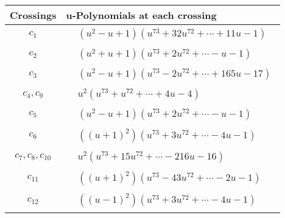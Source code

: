 \documentclass[1p]{elsarticle_modified}
\theoremstyle{definition}
\begin{document}
\begin{tabular}{m{50pt}|m{274pt}}
Crossings & \hspace{64pt}u-Polynomials at each crossing \\
\hline $$\begin{aligned}c_{1}\end{aligned}$$&$\begin{aligned}
&(u^2- u+1)(u^{73}+32 u^{72}+\cdots+11 u-1)
\end{aligned}$\\
\hline $$\begin{aligned}c_{2}\end{aligned}$$&$\begin{aligned}
&(u^2+u+1)(u^{73}+2 u^{72}+\cdots- u-1)
\end{aligned}$\\
\hline $$\begin{aligned}c_{3}\end{aligned}$$&$\begin{aligned}
&(u^2- u+1)(u^{73}-2 u^{72}+\cdots+165 u-17)
\end{aligned}$\\
\hline $$\begin{aligned}c_{4},c_{9}\end{aligned}$$&$\begin{aligned}
&u^2(u^{73}+u^{72}+\cdots+4 u-4)
\end{aligned}$\\
\hline $$\begin{aligned}c_{5}\end{aligned}$$&$\begin{aligned}
&(u^2- u+1)(u^{73}+2 u^{72}+\cdots- u-1)
\end{aligned}$\\
\hline $$\begin{aligned}c_{6}\end{aligned}$$&$\begin{aligned}
&((u+1)^2)(u^{73}+3 u^{72}+\cdots-4 u-1)
\end{aligned}$\\
\hline $$\begin{aligned}c_{7},c_{8},c_{10}\end{aligned}$$&$\begin{aligned}
&u^2(u^{73}+15 u^{72}+\cdots-216 u-16)
\end{aligned}$\\
\hline $$\begin{aligned}c_{11}\end{aligned}$$&$\begin{aligned}
&((u+1)^2)(u^{73}-43 u^{72}+\cdots-2 u-1)
\end{aligned}$\\
\hline $$\begin{aligned}c_{12}\end{aligned}$$&$\begin{aligned}
&((u-1)^2)(u^{73}+3 u^{72}+\cdots-4 u-1)
\end{aligned}$\\
\hline
\end{tabular}\newpage\renewcommand{\arraystretch}{1}
\end{document}
